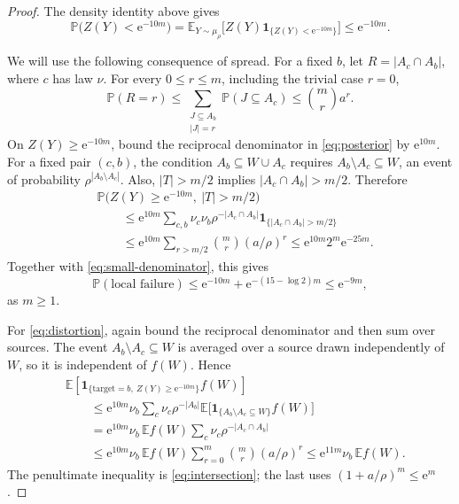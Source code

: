 \documentclass[11pt]{article}
\numberwithin{equation}{section}
\newcommand{\PP}{\mathbb P}
\newcommand{\EE}{\mathbb E}
\newcommand{\ind}{\mathbf 1}
\newcommand{\ee}{\mathrm e}
\begin{document}
\begin{proof}
The density identity above gives
\begin{equation}\label{eq:small-denominator}
 \PP\bigl(Z(Y)<\ee^{-10m}\bigr)
 =\EE_{Y\sim\mu_\rho}
   \bigl[Z(Y)\ind_{\{Z(Y)<\ee^{-10m}\}}\bigr]
 \le\ee^{-10m}.
\end{equation}

We will use the following consequence of spread. For a fixed $b$,
let $R=|A_c\cap A_b|$, where $c$ has law $\nu$. For every
$0\le r\le m$, including the trivial case $r=0$,
\begin{equation}\label{eq:intersection}
 \PP(R=r)
 \le\sum_{\substack{J\subseteq A_b\\|J|=r}}
        \PP(J\subseteq A_c)
 \le\binom mr a^r.
\end{equation}
On $Z(Y)\ge\ee^{-10m}$, bound the reciprocal denominator in
\eqref{eq:posterior} by $\ee^{10m}$. For a fixed pair $(c,b)$,
the condition $A_b\subseteq W\cup A_c$ requires
$A_b\setminus A_c\subseteq W$, an event of probability
$\rho^{|A_b\setminus A_c|}$. Also, $|T|>m/2$ implies
$|A_c\cap A_b|>m/2$. Therefore
\begin{align*}
 &\PP\bigl(Z(Y)\ge\ee^{-10m},\ |T|>m/2\bigr)\\
 &\qquad\le
 \ee^{10m}\sum_{c,b}\nu_c\nu_b
 \rho^{-|A_c\cap A_b|}
 \ind_{\{|A_c\cap A_b|>m/2\}}\\
 &\qquad\le
 \ee^{10m}\sum_{r>m/2}\binom mr(a/\rho)^r
 \le \ee^{10m}2^m\ee^{-25m}.
\end{align*}
Together with \eqref{eq:small-denominator}, this gives
\[
 \PP(\text{local failure})
 \le\ee^{-10m}+\ee^{-(15-\log 2)m}
 \le\ee^{-9m},
\]
as $m\ge1$.

For \eqref{eq:distortion}, again bound the reciprocal denominator
and then sum over sources. The event
$A_b\setminus A_c\subseteq W$ is averaged over a source drawn independently of $W$,
so it is independent of $f(W)$. Hence
\begin{align*}
 &\EE\!\left[
 \ind_{\{\mathrm{target}=b,\ Z(Y)\ge\ee^{-10m}\}} f(W)
 \right]\\
 &\qquad\le
 \ee^{10m}\nu_b\sum_c\nu_c\rho^{-|A_b|}
       \EE\bigl[\ind_{\{A_b\setminus A_c\subseteq W\}}f(W)\bigr]\\
 &\qquad=
 \ee^{10m}\nu_b\,\EE f(W)
       \sum_c\nu_c\rho^{-|A_c\cap A_b|}\\
 &\qquad\le
 \ee^{10m}\nu_b\,\EE f(W)
       \sum_{r=0}^m\binom mr(a/\rho)^r
 \le\ee^{11m}\nu_b\,\EE f(W).
\end{align*}
The penultimate inequality is \eqref{eq:intersection}; the last uses
$(1+a/\rho)^m\le\ee^m$.
\end{proof}
\end{document}
